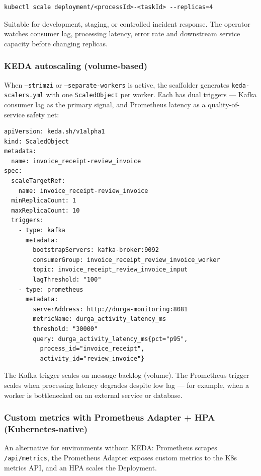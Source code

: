 \begin{verbatim}
kubectl scale deployment/<processId>-<taskId> --replicas=4
\end{verbatim}

Suitable for development, staging, or controlled incident response. The operator
watches consumer lag, processing latency, error rate and downstream service
capacity before changing replicas.

\subsubsection{KEDA autoscaling (volume-based)}

When \texttt{--strimzi} or \texttt{--separate-workers} is active, the
scaffolder generates \texttt{keda-scalers.yml} with one
\texttt{ScaledObject} per worker. Each has dual triggers --- Kafka consumer
lag as the primary signal, and Prometheus latency as a quality-of-service
safety net:

\begin{verbatim}
apiVersion: keda.sh/v1alpha1
kind: ScaledObject
metadata:
  name: invoice_receipt-review_invoice
spec:
  scaleTargetRef:
    name: invoice_receipt-review_invoice
  minReplicaCount: 1
  maxReplicaCount: 10
  triggers:
    - type: kafka
      metadata:
        bootstrapServers: kafka-broker:9092
        consumerGroup: invoice_receipt_review_invoice_worker
        topic: invoice_receipt_review_invoice_input
        lagThreshold: "100"
    - type: prometheus
      metadata:
        serverAddress: http://durga-monitoring:8081
        metricName: durga_activity_latency_ms
        threshold: "30000"
        query: durga_activity_latency_ms{pct="p95",
          process_id="invoice_receipt",
          activity_id="review_invoice"}
\end{verbatim}

The Kafka trigger scales on message backlog (volume). The Prometheus trigger
scales when processing latency degrades despite low lag --- for example, when
a worker is bottlenecked on an external service or database.

\subsubsection{Custom metrics with Prometheus Adapter + HPA (Kubernetes-native)}

An alternative for environments without KEDA: Prometheus scrapes
\texttt{/api/metrics}, the Prometheus Adapter exposes custom metrics to
the K8s metrics API, and an HPA scales the Deployment.

